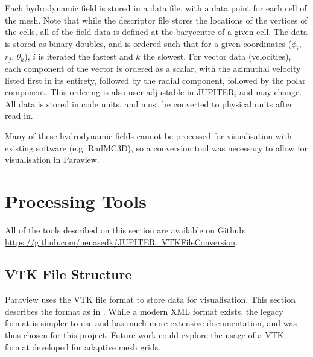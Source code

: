 \documentclass[twocolumn]{aastex62}
\begin{document}
Each hydrodynamic field is stored in a data file, with a data point for each cell of the mesh. Note that while the descriptor file stores the locations of the vertices of the cells, all of the field data is defined at the barycentre of a given cell. The data is stored as binary doubles, and is ordered such that for a given coordinates ($\phi_{i}$, $r_{j}$, $\theta_{k}$), $i$ is iterated the fastest and $k$ the slowest. For vector data (velocities), each component of the vector is ordered as a scalar, with the azimuthal velocity listed first in its entirety, followed by the radial component, followed by the polar component. This ordering is also user adjustable in JUPITER, and may change. All data is stored in code units, and must be converted to physical units after read in.

Many of these hydrodynamic fields cannot be processed for visualisation with existing software (e.g. RadMC3D), so a conversion tool was necessary to allow for visualisation in Paraview.
\section{Processing Tools}\label{sec:code}
All of the tools described on this section are available on Github: \url{https://github.com/nenasedk/JUPITER_VTKFileConversion}. 
\subsection{VTK File Structure}\label{sec:vtk}
Paraview uses the VTK file format to store data for visualisation. This section describes the format as in \cite{Formats2009}. While a modern XML format exists, the legacy format is simpler to use and has much more extensive documentation, and was thus chosen for this project. Future work could explore the usage of a VTK format developed for adaptive mesh grids.
\end{document}
